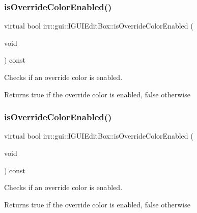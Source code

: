 \subsubsection{\texorpdfstring{is\+Override\+Color\+Enabled()}{isOverrideColorEnabled()}\hspace{0.1cm}{\footnotesize\ttfamily [1/2]}}
{\footnotesize\ttfamily virtual bool irr\+::gui\+::\+I\+G\+U\+I\+Edit\+Box\+::is\+Override\+Color\+Enabled (\begin{DoxyParamCaption}\item[{void}]{ }\end{DoxyParamCaption}) const\hspace{0.3cm}{\ttfamily [pure virtual]}}



Checks if an override color is enabled. 

\begin{DoxyReturn}{Returns}
true if the override color is enabled, false otherwise 
\end{DoxyReturn}
\mbox{\label{classirr_1_1gui_1_1IGUIEditBox_ae62dac299d0101be9d78ed3db9a2d314}} 
\subsubsection{\texorpdfstring{is\+Override\+Color\+Enabled()}{isOverrideColorEnabled()}\hspace{0.1cm}{\footnotesize\ttfamily [2/2]}}
{\footnotesize\ttfamily virtual bool irr\+::gui\+::\+I\+G\+U\+I\+Edit\+Box\+::is\+Override\+Color\+Enabled (\begin{DoxyParamCaption}\item[{void}]{ }\end{DoxyParamCaption}) const\hspace{0.3cm}{\ttfamily [pure virtual]}}



Checks if an override color is enabled. 

\begin{DoxyReturn}{Returns}
true if the override color is enabled, false otherwise 
\end{DoxyReturn}
\mbox{\label{classirr_1_1gui_1_1IGUIEditBox_ad0fd4782c052341744ea9d1f61f80e01}} 

